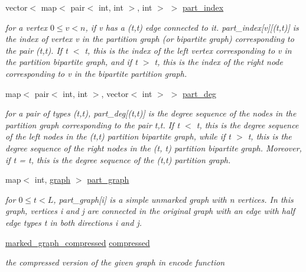 \begin{DoxyCompactItemize}
vector$<$ map$<$ pair$<$ int, int $>$, int $>$ $>$ \hyperlink{classmarked__graph__encoder_a1d3e2b90f5d46244fd4cb33c69ac81f1}{part\+\_\+index}
\begin{DoxyCompactList}\small\item\em for a vertex $0 \leq v < n$, if v has a (t,t\textquotesingle{}) edge connected to it. part\+\_\+index\mbox{[}v\mbox{]}\mbox{[}(t,t\textquotesingle{})\mbox{]} is the index of vertex v in the partition graph (or bipartite graph) corresponding to the pair (t,t\textquotesingle{}). If t $<$ t\textquotesingle{}, this is the index of the left vertex corresponding to v in the partition bipartite graph, and if t $>$ t\textquotesingle{}, this is the index of the right node corresponding to v in the bipartite partition graph. \end{DoxyCompactList}\item 
map$<$ pair$<$ int, int $>$, vector$<$ int $>$ $>$ \hyperlink{classmarked__graph__encoder_a55ea2edb2609dfc287432f61900d6ad1}{part\+\_\+deg}
\begin{DoxyCompactList}\small\item\em for a pair of types (t,t\textquotesingle{}), part\+\_\+deg\mbox{[}(t,t\textquotesingle{})\mbox{]} is the degree sequence of the nodes in the partition graph corresponding to the pair t,t\textquotesingle{}. If t $<$ t\textquotesingle{}, this is the degree sequence of the left nodes in the (t,t\textquotesingle{}) partition bipartite graph, while if t $>$ t\textquotesingle{}, this is the degree sequence of the right nodes in the (t\textquotesingle{}, t) partition bipartite graph. Moreover, if t = t\textquotesingle{}, this is the degree sequence of the (t,t) partition graph. \end{DoxyCompactList}\item 
map$<$ int, \hyperlink{classgraph}{graph} $>$ \hyperlink{classmarked__graph__encoder_adbafd0769ae301acc1b2c19b5e1d4844}{part\+\_\+graph}
\begin{DoxyCompactList}\small\item\em for $0 \leq t < L$, part\+\_\+graph\mbox{[}i\mbox{]} is a simple unmarked graph with n vertices. In this graph, vertices i and j are connected in the original graph with an edge with half edge types t in both directions i and j. \end{DoxyCompactList}\item 
\hyperlink{classmarked__graph__compressed}{marked\+\_\+graph\+\_\+compressed} \hyperlink{classmarked__graph__encoder_ac2ded200860fdd2321f86dd76b28bcb3}{compressed}
\begin{DoxyCompactList}\small\item\em the compressed version of the given graph in encode function \end{DoxyCompactList}\end{DoxyCompactItemize}


